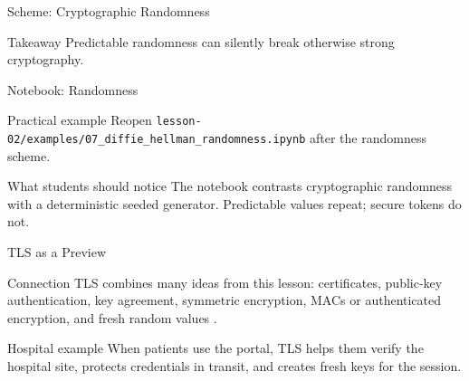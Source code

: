 \documentclass[presentation]{beamer}
\begin{document}
\begin{frame}[c]{Scheme: Cryptographic Randomness}
\begin{center}
\end{center}

\begin{block}{Takeaway}
Predictable randomness can silently break otherwise strong cryptography.
\end{block}
\end{frame}

\begin{frame}[c]{Notebook: Randomness}
\begin{block}{Practical example}
Reopen \texttt{lesson-02/examples/07\_diffie\_hellman\_randomness.ipynb} after the randomness
scheme.
\end{block}

\begin{exampleblock}{What students should notice}
The notebook contrasts cryptographic randomness with a deterministic seeded generator. Predictable
values repeat; secure tokens do not.
\end{exampleblock}
\end{frame}

\begin{frame}[c]{TLS as a Preview}
\begin{block}{Connection}
TLS combines many ideas from this lesson: certificates, public-key authentication, key agreement,
symmetric encryption, MACs or authenticated encryption, and fresh random values \cite{rfc8446}.
\end{block}

\begin{exampleblock}{Hospital example}
When patients use the portal, TLS helps them verify the hospital site, protects credentials in
transit, and creates fresh keys for the session.
\end{exampleblock}
\end{frame}
\end{document}
